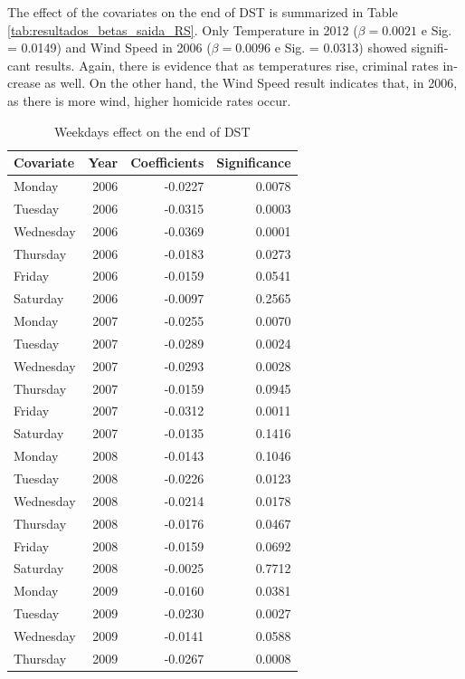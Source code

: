 \documentclass[12pt,openright,oneside,a4paper,english,french,spanish]{abntex2}
\numberwithin{table}{section} %
\numberwithin{figure}{section} %
\begin{document}
\begin{otherlanguage}{english}
The effect of the covariates on the end of DST is summarized in Table \ref{tab:resultados_betas_saida_RS}. Only Temperature in 2012 ($\beta = 0.0021$ e Sig. = 0.0149) and Wind Speed in 2006 ($\beta = 0.0096$ e Sig. = 0.0313) showed significant results. Again, there is evidence that as temperatures rise, criminal rates increase as well. On the other hand, the Wind Speed result indicates that, in 2006, as there is more wind, higher homicide rates occur.


\begin{table}[H]
\caption{Weekdays effect on the end of DST}
\begin{center}
\begin{tiny}
\begin{tabular}{lrrr}
  \hline
Covariate & Year & Coefficients & Significance \\
  \hline
  Monday &  2006 & -0.0227 & 0.0078 \\ 
  Tuesday &  2006 & -0.0315 & 0.0003 \\ 
  Wednesday &  2006 & -0.0369 & 0.0001 \\ 
  Thursday &  2006 & -0.0183 & 0.0273 \\ 
  Friday &  2006 & -0.0159 & 0.0541 \\ 
  Saturday &  2006 & -0.0097 & 0.2565 \\ 
  Monday &  2007 & -0.0255 & 0.0070 \\ 
  Tuesday &  2007 & -0.0289 & 0.0024 \\ 
  Wednesday &  2007 & -0.0293 & 0.0028 \\ 
  Thursday &  2007 & -0.0159 & 0.0945 \\ 
  Friday &  2007 & -0.0312 & 0.0011 \\ 
  Saturday &  2007 & -0.0135 & 0.1416 \\ 
  Monday &  2008 & -0.0143 & 0.1046 \\ 
  Tuesday &  2008 & -0.0226 & 0.0123 \\ 
  Wednesday &  2008 & -0.0214 & 0.0178 \\ 
  Thursday &  2008 & -0.0176 & 0.0467 \\ 
  Friday &  2008 & -0.0159 & 0.0692 \\ 
  Saturday &  2008 & -0.0025 & 0.7712 \\ 
  Monday &  2009 & -0.0160 & 0.0381 \\ 
  Tuesday &  2009 & -0.0230 & 0.0027 \\ 
  Wednesday &  2009 & -0.0141 & 0.0588 \\ 
  Thursday &  2009 & -0.0267 & 0.0008 \\ 

\end{tabular}
\end{tiny}
\end{center}
\end{table}
\end{otherlanguage}
\end{document}
